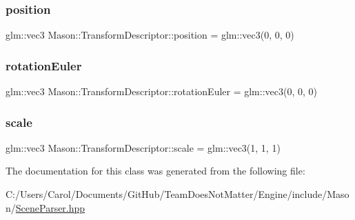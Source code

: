 \subsubsection{\texorpdfstring{position}{position}}
{\footnotesize\ttfamily glm\+::vec3 Mason\+::\+Transform\+Descriptor\+::position = glm\+::vec3(0, 0, 0)}

\hypertarget{class_mason_1_1_transform_descriptor_aa66cc703fd520b19b4347b390eabfc41}{}\label{class_mason_1_1_transform_descriptor_aa66cc703fd520b19b4347b390eabfc41} 
\subsubsection{\texorpdfstring{rotation\+Euler}{rotationEuler}}
{\footnotesize\ttfamily glm\+::vec3 Mason\+::\+Transform\+Descriptor\+::rotation\+Euler = glm\+::vec3(0, 0, 0)}

\hypertarget{class_mason_1_1_transform_descriptor_a5d264880a0c22c624c996057bf59b752}{}\label{class_mason_1_1_transform_descriptor_a5d264880a0c22c624c996057bf59b752} 
\subsubsection{\texorpdfstring{scale}{scale}}
{\footnotesize\ttfamily glm\+::vec3 Mason\+::\+Transform\+Descriptor\+::scale = glm\+::vec3(1, 1, 1)}



The documentation for this class was generated from the following file\+:\begin{DoxyCompactItemize}
\item 
C\+:/\+Users/\+Carol/\+Documents/\+Git\+Hub/\+Team\+Does\+Not\+Matter/\+Engine/include/\+Mason/\hyperlink{_scene_parser_8hpp}{Scene\+Parser.\+hpp}\end{DoxyCompactItemize}
